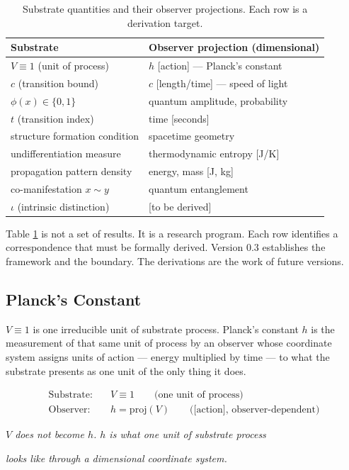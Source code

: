 \documentclass[12pt, letterpaper]{article}
\begin{document}
\begin{table}[htbp]
\caption{\label{tab:projection}Substrate quantities and their observer projections. Each row is a derivation target.}
\centering
\begin{tabular}{lp{7.5cm}}
\toprule
\textbf{Substrate} & \textbf{Observer projection (dimensional)}\\
\midrule
\(V \equiv 1\) (unit of process) & \(h\) {[}action] --- Planck's constant\\
\(c\) (transition bound) & \(c\) {[}length/time] --- speed of light\\
\(\phi(x) \in \{0,1\}\) & quantum amplitude, probability\\
\(t\) (transition index) & time [seconds]\\
structure formation condition & spacetime geometry\\
undifferentiation measure & thermodynamic entropy [J/K]\\
propagation pattern density & energy, mass [J, kg]\\
co-manifestation \(x \sim y\) & quantum entanglement\\
\(\iota\) (intrinsic distinction) & {[}to be derived]\\
\bottomrule
\end{tabular}
\end{table}

Table \ref{tab:projection} is not a set of results. It is a research program. Each row
identifies a correspondence that must be formally derived. Version 0.3
establishes the framework and the boundary. The derivations are the work of
future versions.
\subsection{Planck's Constant}
\label{sec:org5ac5208}

\(V \equiv 1\) is one irreducible unit of substrate process. Planck's constant
\(h\) is the measurement of that same unit of process by an observer whose
coordinate system assigns units of action --- energy multiplied by time --- to
what the substrate presents as one unit of the only thing it does.

\begin{formulabox}
\begin{align}
\text{Substrate:} \quad & V \equiv 1 \qquad \text{(one unit of process)} \tag{10} \\
\text{Observer:}  \quad & h = \mathrm{proj}(V) \qquad \text{([action], observer-dependent)} \tag{11}
\end{align}
\centerline{\textit{$V$ does not become $h$. $h$ is what one unit of substrate process}}
\centerline{\textit{looks like through a dimensional coordinate system.}}
\end{formulabox}
\end{document}
